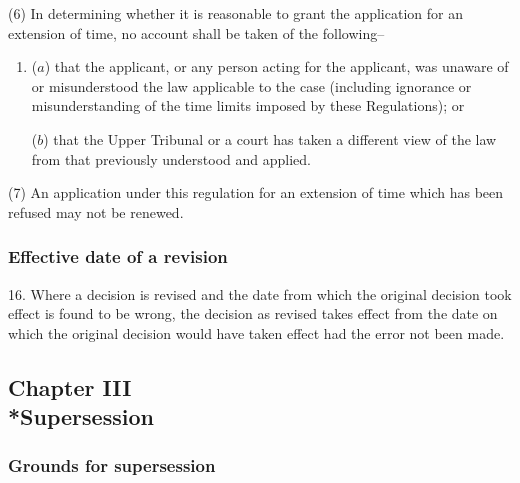\documentclass[12pt,a4paper]{article}
\begin{document}
(6) In determining whether it is reasonable to grant the application for an extension of time, no account shall be taken of the following–
\begin{enumerate}\item[]
($a$) that the applicant, or any person acting for the applicant, was unaware of or misunderstood the law applicable to the case (including ignorance or misunderstanding of the time limits imposed by these Regulations); or

($b$) that the Upper Tribunal or a court has taken a different view of the law from that previously understood and applied.
\end{enumerate}

(7) An application under this regulation for an extension of time which has been refused may not be renewed.

\subsubsection[16. Effective date of a revision]{Effective date of a revision}

16.  Where a decision is revised and the date from which the original decision took effect is found to be wrong, the decision as revised takes effect from the date on which the original decision would have taken effect had the error not been made.

\subsection[Chapter III --- Supersession]{Chapter III\\*Supersession}

\renewcommand\parthead{--- Part III Chapter III}

\subsubsection[17. Grounds for supersession]{Grounds for supersession}
\end{document}
